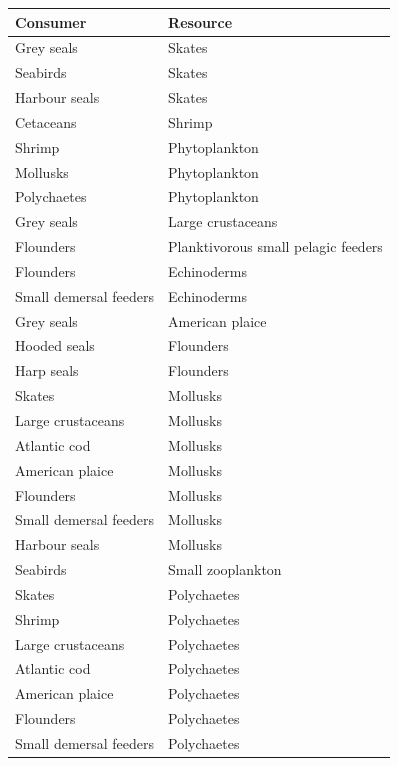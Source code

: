 \begin{singlespace}
\begin{longtable}{ p{} p{} }
    \toprule
      Consumer               & Resource \\
    \hline  \hline
    \endhead

    Grey seals             & Skates \\
    Seabirds               & Skates \\
    Harbour seals          & Skates \\
    Cetaceans              & Shrimp \\
    Shrimp                 & Phytoplankton  \\
    Mollusks               & Phytoplankton  \\
    Polychaetes            & Phytoplankton  \\
    Grey seals             & Large crustaceans  \\
    Flounders              & Planktivorous small pelagic feeders    \\
    Flounders              & Echinoderms    \\
    Small demersal feeders & Echinoderms    \\
    Grey seals             & American plaice    \\
    Hooded seals           & Flounders  \\
    Harp seals             & Flounders  \\
    Skates                 & Mollusks   \\
    Large crustaceans      & Mollusks   \\
    Atlantic cod           & Mollusks   \\
    American plaice        & Mollusks   \\
    Flounders              & Mollusks   \\
    Small demersal feeders & Mollusks   \\
    Harbour seals          & Mollusks   \\
    Seabirds               & Small zooplankton  \\
    Skates                 & Polychaetes    \\
    Shrimp                 & Polychaetes    \\
    Large crustaceans      & Polychaetes    \\
    Atlantic cod           & Polychaetes    \\
    American plaice        & Polychaetes    \\
    Flounders              & Polychaetes    \\
    Small demersal feeders & Polychaetes    \\

\end{longtable}
\end{singlespace}
